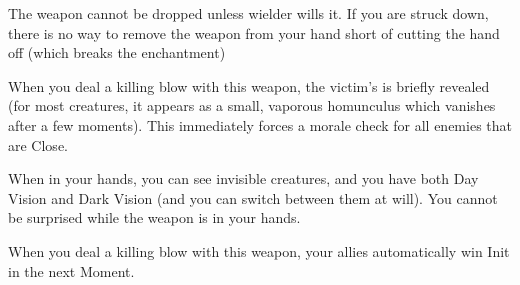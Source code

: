 {

The weapon cannot be dropped unless wielder wills it.  If you are struck down, there is no way to remove the weapon from your hand short of cutting the hand off (which breaks the enchantment)



When you deal a killing blow with this weapon, the victim's  is briefly revealed (for most creatures, it appears as a small, vaporous homunculus which vanishes after a few moments).  This immediately forces a morale check for all enemies that are Close.



When in your hands, you can see invisible creatures, and you have both Day Vision and Dark Vision (and you can switch between them at will).  You cannot be surprised while the weapon is in your hands.



When you deal a killing blow with this weapon, your allies automatically win Init in the next Moment.


}%

